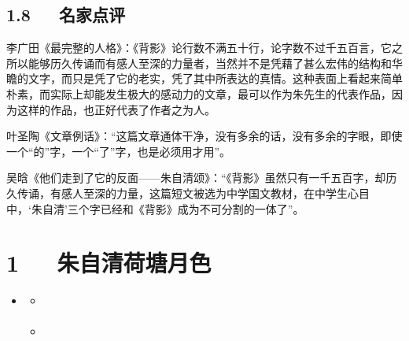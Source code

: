 \documentclass[letterpaper,12pt,english]{sphinxmanual}
\begin{document}
\section{1.8   名家点评}
\label{\detokenize{p01_u6563_u6587/_u6731_u81ea_u6e05-_u80cc_u5f71:id13}}
李广田《最完整的人格》：《背影》论行数不满五十行，论字数不过千五百言，它之所以能够历久传诵而有感人至深的力量者，当然并不是凭藉了甚么宏伟的结构和华瞻的文字，而只是凭了它的老实，凭了其中所表达的真情。这种表面上看起来简单朴素，而实际上却能发生极大的感动力的文章，最可以作为朱先生的代表作品，因为这样的作品，也正好代表了作者之为人。

叶圣陶《文章例话》：“这篇文章通体干净，没有多余的话，没有多余的字眼，即使一个“的”字，一个“了”字，也是必须用才用”。

吴晗《他们走到了它的反面——朱自清颂》：“《背影》虽然只有一千五百字，却历久传诵，有感人至深的力量，这篇短文被选为中学国文教材，在中学生心目中，‘朱自清’三个字已经和《背影》成为不可分割的一体了”。


\chapter{1   朱自清\sphinxhyphen{}荷塘月色}
\label{\detokenize{p01_u6563_u6587/_u6731_u81ea_u6e05-_u8377_u5858_u6708_u8272:id1}}\label{\detokenize{p01_u6563_u6587/_u6731_u81ea_u6e05-_u8377_u5858_u6708_u8272::doc}}
\begin{sphinxShadowBox}
\begin{itemize}
\item {} 
\label{\detokenize{p01_u6563_u6587/_u6731_u81ea_u6e05-_u8377_u5858_u6708_u8272:id5}}{\hyperref[\detokenize{p01_u6563_u6587/_u6731_u81ea_u6e05-_u8377_u5858_u6708_u8272:id1}]{}}
\begin{itemize}
\item {} 
\label{\detokenize{p01_u6563_u6587/_u6731_u81ea_u6e05-_u8377_u5858_u6708_u8272:id6}}{\hyperref[\detokenize{p01_u6563_u6587/_u6731_u81ea_u6e05-_u8377_u5858_u6708_u8272:id3}]{}}

\item {} 
\label{\detokenize{p01_u6563_u6587/_u6731_u81ea_u6e05-_u8377_u5858_u6708_u8272:id7}}{\hyperref[\detokenize{p01_u6563_u6587/_u6731_u81ea_u6e05-_u8377_u5858_u6708_u8272:id4}]{}}

\end{itemize}

\end{itemize}
\end{sphinxShadowBox}
\end{document}
